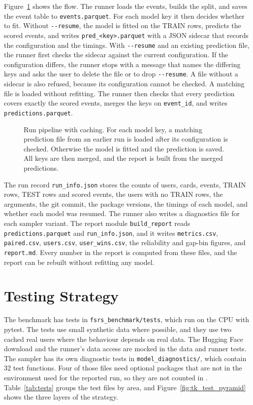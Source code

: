 Figure~\ref{fig:tk_run_pipeline} shows the flow. The runner loads the events, builds the split, and saves
the event table to \texttt{events.parquet}. For each model key it then decides whether to fit. Without
\texttt{-{}-resume}, the model is fitted on the TRAIN rows, predicts the scored events, and writes
\texttt{pred\_<key>.parquet} with a JSON sidecar that records the configuration and the timings. With
\texttt{-{}-resume} and an existing prediction file, the runner first checks the sidecar against the current
configuration. If the configuration differs, the runner stops with a message that names the differing
keys and asks the user to delete the file or to drop \texttt{-{}-resume}. A file without a sidecar is also
refused, because its configuration cannot be checked. A matching file is loaded without refitting. The
runner then checks that every prediction covers exactly the scored events, merges the keys on
\texttt{event\_id}, and writes \texttt{predictions.parquet}.

\begin{figure}[htbp]
  \centering
  
  \caption{Run pipeline with caching. For each model key, a matching prediction file from an earlier run is
    loaded after its configuration is checked. Otherwise the model is fitted and the prediction is saved. All
    keys are then merged, and the report is built from the merged predictions.}
  \label{fig:tk_run_pipeline}
\end{figure}

The run record \texttt{run\_info.json} stores the counts of users, cards, events, TRAIN rows, TEST rows and
scored events, the users with no TRAIN rows, the arguments, the git commit, the package versions, the
timings of each model, and whether each model was resumed. The runner also writes a diagnostics file for each
sampler variant. The report module \texttt{build\_report} reads \texttt{predictions.parquet} and
\texttt{run\_info.json}, and it writes \texttt{metrics.csv}, \texttt{paired.csv}, \texttt{users.csv},
\texttt{user\_wins.csv}, the reliability and gap-bin figures, and \texttt{report.md}. Every number in the
report is computed from these files, and the report can be rebuilt without refitting any model.

\section{Testing Strategy}
\label{sec:impl-testing}

The benchmark has \NumBenchTests{} tests in \texttt{fsrs\_benchmark/\allowbreak tests}, which run on the CPU with
pytest. The tests use small synthetic data where possible, and they use two cached real users where the
behaviour depends on real data. The Hugging Face download and the runner's data access are mocked in the data and runner tests. The sampler
has its own diagnostic tests in \texttt{model\_diagnostics/}, which contain 32 test functions. Four of those
files need optional packages that are not in the environment used for the reported run, so they are not
counted in \NumBenchTests{}. Table~\ref{tab:tests} groups the test files by area, and
Figure~\ref{fig:tk_test_pyramid} shows the three layers of the strategy.

